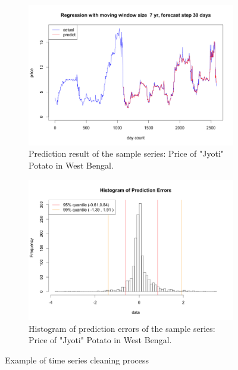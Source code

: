 \begin{figure}[!ht]
    \centering
        \begin{subfigure}[b]{.45\textwidth}
        \centering
        \includegraphics[width=\textwidth]{./img/regression_prediction.png}
        \caption{Prediction result of the sample series: Price of "Jyoti" Potato in West Bengal.}
        \label{subfig:tmp1}
        \end{subfigure}
        \quad
        \begin{subfigure}[b]{.45\textwidth}
        \centering
        \includegraphics[width=\textwidth]{./img/histogram_of_errors.png}
        \caption{Histogram of prediction errors of the sample series: Price of "Jyoti" Potato in West Bengal.}
        \label{subfig:tmp2}
        \end{subfigure}

    \caption{Example of time series cleaning process}
    \label{fig:tm_pred}
\end{figure}

